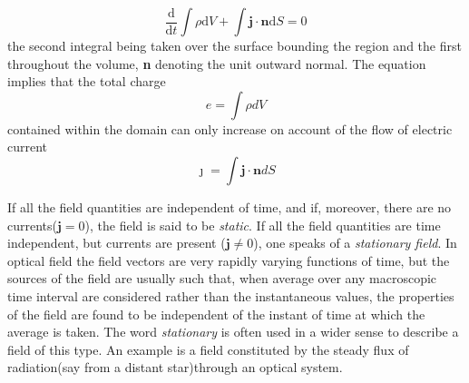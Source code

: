 \documentclass[lang=en,11pt]{elegantbook}
\begin{document}
	\begin{equation}
	\frac{\mathrm{d}}{\mathrm{d} t} \int \rho \mathrm{d} V+\int \mathbf{j} \cdot \mathbf{n} \mathrm{d} S=0
	\label{1-6}
	\end{equation}
	the second integral being taken over the surface bounding the region and the first throughout the volume, \textbf{n} denoting the unit outward normal. The equation implies that the total charge
	\begin{equation}
	e=\int \rho dV
	\label{1-7}
	\end{equation}
	contained within the domain can only increase on account of the flow of electric current
	\begin{equation}
	\jmath=\int \mathbf{j}\cdot\mathbf{n}dS
	\label{1-8}
	\end{equation}
	\par 
	If all the field quantities are independent of time, and if, moreover, there are no currents($\textbf{j}=0$), the field is said to be \textit{static}. If all the field quantities are time independent, but currents are present ($\mathbf{j}\neq 0$), one speaks of a \textit{stationary field}. In optical field the field vectors are very rapidly varying functions of time, but the sources of the field are usually such that, when average over any macroscopic time interval are considered rather than the instantaneous values, the properties of the field are found to be independent of the instant of time at which the average is taken. The word \textit{stationary} is often used in a wider sense to describe a field of this type. An example is a field constituted by the steady flux of radiation(say from a distant star)through an optical system. 
	
\end{document}
